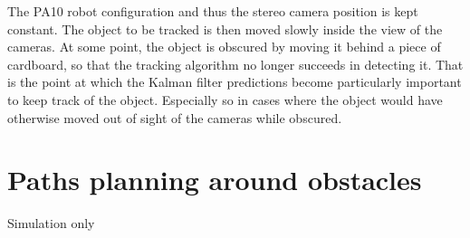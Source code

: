 The PA10 robot configuration and thus the stereo camera position is kept constant.
The object to be tracked is then moved slowly inside the view of the cameras. At some point, the object is obscured by moving it behind a piece of cardboard, so that the tracking algorithm no longer succeeds in detecting it.
That is the point at which the Kalman filter predictions become particularly important to keep track of the object. Especially so in cases where the object would have otherwise moved out of sight of the cameras while obscured.


\section{Paths planning around obstacles}
Simulation only
